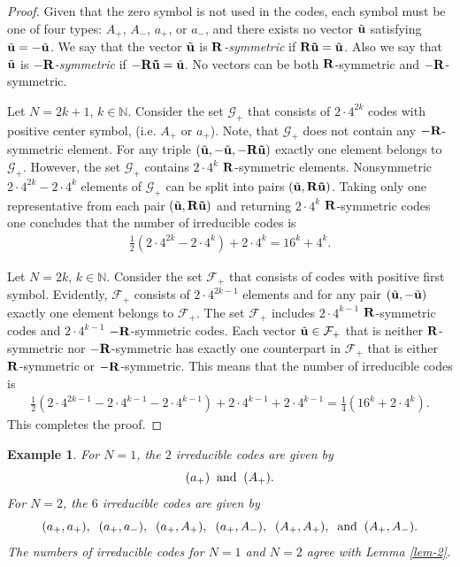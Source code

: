 \documentclass[12pt,reqno]{amsart}
\newtheorem{example}{Example}
\begin{document}
\begin{proof}
Given that the zero symbol is not used in the codes, each symbol must be one of four types: $A_+$, $A_-$, $a_+$, or $a_-$, and there exists no vector $\tilde{\bf u}$ satisfying $\tilde{\bf u} = - \tilde{\bf u}$. We say that the vector $\tilde{\bf u}$ is {\it ${\bf R}$-symmetric} if ${\bf R \tilde{u}}= \tilde{\bf u}$. Also we say that $\tilde{\bf u}$ is {\it $-{\bf R}$-symmetric} if $-{\bf R \tilde{u}} = \tilde{\bf u}$. No vectors can be both ${\bf R}$-symmetric and $-{\bf R}$-symmetric.

Let $N = 2k+1$, $k \in \mathbb{N}$.  Consider the set ${\mathcal G}_+$ that consists of  $2\cdot 4^{2k}$ codes with positive center symbol,  (i.e. $A_+$ or $a_+$). Note, that ${\mathcal G}_+$ does not contain any $-{\bf R}$-symmetric element. For any triple  $(\tilde{\bf u},-\tilde{\bf u}, -{\bf R \tilde{u}})$  exactly one element belongs to ${\mathcal G}_+$. However, the set ${\mathcal G}_+$ contains $2\cdot 4^k$ ${\bf R}$-symmetric elements.  Nonsymmetric $2\cdot 4^{2k}-2\cdot 4^{k}$ elements of ${\mathcal G}_+$ can be split into pairs $(\tilde{\bf u},{\bf R \tilde{u}})$. Taking only one representative from each pair  $(\tilde{\bf u},{\bf R \tilde{u}})$ and returning $2\cdot 4^k$ ${\bf R}$-symmetric codes one concludes that the number of irreducible codes is
\begin{gather*}
\frac12\left(2\cdot 4^{2k}-2\cdot4^{k}\right)+2\cdot 4^k=16^k+4^k.
\end{gather*}

Let $N=2k$,  $k \in \mathbb{N}$. Consider the set ${\mathcal F}_+$ that consists of codes with positive first symbol. Evidently, ${\mathcal F}_+$ consists of $2\cdot 4^{2k-1}$ elements and for any pair  $(\tilde{\bf u},-\tilde{\bf u})$ exactly one element belongs to ${\mathcal F}_+$. The set ${\mathcal F}_+$ includes $2\cdot 4^{k-1}$ ${\bf R}$-symmetric codes and $2\cdot 4^{k-1}$ $-{\bf R}$-symmetric codes. Each vector $\tilde{\bf u}\in {\mathcal F}_+$ that is neither ${\bf R}$-symmetric nor $-{\bf R}$-symmetric has exactly one counterpart  in ${\mathcal F}_+$ that is either ${\bf R}$-symmetric or $-{\bf R}$-symmetric. This means that the number of irreducible codes is
\begin{gather*}
\frac12 (2\cdot 4^{2k-1}-2\cdot 4^{k-1}-2\cdot 4^{k-1})+2\cdot 4^{k-1}+2\cdot 4^{k-1}=\frac14 (16^k+2\cdot 4^k).
\end{gather*}
This completes the proof.
\end{proof}

\begin{example}
	\label{ex-2}
	For $N = 1$, the $2$ irreducible codes are given by 
	$$
	(a_+)  \;\; \mbox{\rm and} \;\; (A_+).
	$$
	For $N = 2$, the $6$ irreducible codes are given by 
	$$
	(a_+,a_+), \;\; (a_+,a_-), \;\; (a_+,A_+), \;\; (a_+,A_-), 
	\;\; (A_+,A_+), \;\; \mbox{\rm and} \;\; (A_+,A_-).
	$$
	The numbers of irreducible codes for $N = 1$ and $N = 2$ agree with Lemma \ref{lem-2}.
\end{example}
\end{document}
